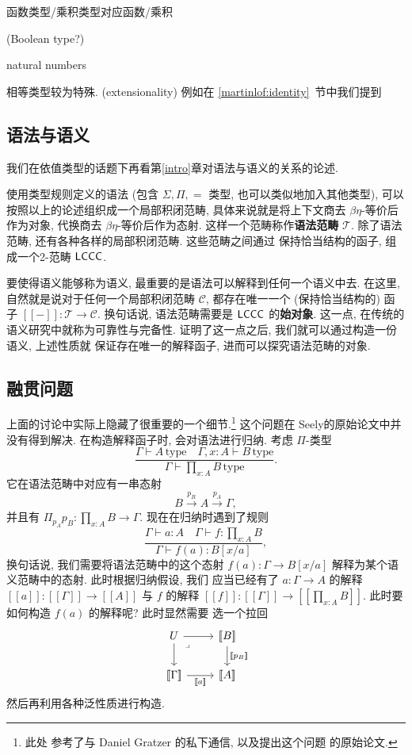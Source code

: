 函数类型/乘积类型对应函数/乘积

(Boolean type?)

natural numbers

相等类型较为特殊. (extensionality) 例如在
\ref{martinlof:identity}~节中我们提到

\subsection{语法与语义}

我们在依值类型的话题下再看第\ref{intro}章对语法与语义的关系的论述.

使用类型规则定义的语法 (包含 \(\Sigma,\Pi,=\) 类型,
也可以类似地加入其他类型), 可以按照以上的论述组织成一个局部积闭范畴,
具体来说就是将上下文商去 \(\beta\eta\)-等价后作为对象,
代换商去 \(\beta\eta\)-等价后作为态射.
这样一个范畴称作\textbf{语法范畴} \(\mathcal T\).
除了语法范畴, 还有各种各样的局部积闭范畴. 这些范畴之间通过
保持恰当结构的函子, 组成一个2-范畴 \(\textsf{LCCC}\).

要使得语义能够称为语义, 最重要的是语法可以解释到任何一个语义中去.
在这里, 自然就是说对于任何一个局部积闭范畴 \(\mathcal C\),
都存在唯一一个 (保持恰当结构的) 函子 \([\![-]\!] : \mathcal T \to \mathcal C\).
换句话说, 语法范畴需要是 \(\textsf{LCCC}\) 的\textbf{始对象}.
这一点, 在传统的语义研究中就称为可靠性与完备性.
证明了这一点之后, 我们就可以通过构造一份语义, 上述性质就
保证存在唯一的解释函子, 进而可以探究语法范畴的对象.

\subsection{融贯问题}

上面的讨论中实际上隐藏了很重要的一个细节.\footnote{此处
参考了与 Daniel Gratzer 的私下通信, 以及提出这个问题
的原始论文\cite{hofmann:1995:lccccoh}.} 这个问题在
Seely的原始论文中并没有得到解决.
在构造解释函子时, 会对语法进行归纳.
考虑 \(\Pi\)-类型
\[\frac{\Gamma \vdash A\,\text{type}
\quad \Gamma, x{:}A \vdash B\,\text{type} }
{\Gamma \vdash \prod_{x:A} B \,\text{type}}.\]
它在语法范畴中对应有一串态射
\[B \xrightarrow{p_B} A \xrightarrow{p_A} \Gamma,\]
并且有 \(\Pi_{p_A} p_B : \prod_{x:A}B \to \Gamma\).
现在在归纳时遇到了规则
\[\frac{\Gamma \vdash a : A
\quad \Gamma \vdash f : \prod_{x:A}B}
{\Gamma \vdash f(a) : B[x/a]},\]
换句话说, 我们需要将语法范畴中的这个态射
\(f(a) : \Gamma \to B[x/a]\)
解释为某个语义范畴中的态射. 此时根据归纳假设, 我们
应当已经有了 \(a : \Gamma \to A\) 的解释
\([\![a]\!] : [\![\Gamma]\!] \to [\![A]\!]\)
与 \(f\) 的解释
\([\![f]\!] : [\![\Gamma]\!] \to [\![\prod_{x:A} B]\!]\).
此时要如何构造 \(f(a)\) 的解释呢? 此时显然需要
选一个拉回
\[\begin{tikzcd}
  U & {[\![B]\!]} \\
  {[\![\Gamma]\!]} & {[\![A]\!]}
  \arrow["{[\![a]\!]}"', from=2-1, to=2-2]
  \arrow["{[\![p_B]\!]}", from=1-2, to=2-2]
  \arrow[from=1-1, to=2-1]
  \arrow[from=1-1, to=1-2]
  \arrow["\lrcorner"{anchor=center, pos=0.125}, draw=none, from=1-1, to=2-2]
\end{tikzcd}\]
然后再利用各种泛性质进行构造.

